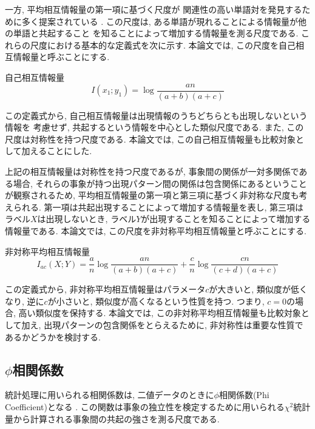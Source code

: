 一方, 平均相互情報量の第一項に基づく尺度が
関連性の高い単語対を発見するために多く提案されている
\cite{Church90,Rosenfeld96,Kita99}. 
この尺度は, ある単語が現れることによる情報量が他の単語と共起すること
を知ることによって増加する情報量を測る尺度である. 
これらの尺度における基本的な定義式を次に示す\cite{Church90}. 
本論文では, この尺度を自己相互情報量と呼ぶことにする. 
\begin{df} 自己相互情報量
\begin{equation}
I(x_1;y_1)=\log\frac{an}{(a+b)(a+c)}
\label{p-mi}
\end{equation}
\end{df}
この定義式から, 自己相互情報量は出現情報のうちどちらとも出現しないという情報を
考慮せず, 共起するという情報を中心とした類似尺度である. 
また, この尺度は対称性を持つ尺度である. 
本論文では, この自己相互情報量も比較対象として加えることにした. 

上記の相互情報量は対称性を持つ尺度であるが, 事象間の関係が一対多関係である場合, それらの事象が持つ出現パターン間の関係は包含関係にあるということが観察されるため, 平均相互情報量の第一項と第三項に基づく非対称な尺度も考えられる. 第一項は共起出現することによって増加する情報量を表し, 第三項はラベル$X$は出現しないとき, ラベル$Y$が出現することを知ることによって増加する情報量である. 本論文では, この尺度を非対称平均相互情報量と呼ぶことにする. 
\begin{df} 非対称平均相互情報量
\begin{equation}
I_{ac}(X;Y)=\frac{a}{n}{\log}\frac{a n}{(a+b)(a+c)}
+\frac{c}{n}{\log}\frac{c n}{(c+d)(a+c)}
\label{ac-mi}
\end{equation}
\end{df}
この定義式から, 非対称平均相互情報量はパラメータ$c$が大きいと, 類似度が低くなり, 逆に$c$が小さいと, 類似度が高くなるという性質を持つ. つまり, $c = 0$の場合, 高い類似度を保持する. 本論文では, この非対称平均相互情報量も比較対象として加え, 出現パターンの包含関係をとらえるために, 非対称性は重要な性質であるかどうかを検討する. 

\subsection{$\phi$相関係数}
統計処理に用いられる相関係数は, 二値データのときに$\phi$相関係数(Phi Coefficient)となる
\cite{TU-class94}. この関数は事象の独立性を検定するために用いられる$\chi^2$統計
量から計算される事象間の共起の強さを測る尺度である\cite{TU-class94,Manning99}. 

